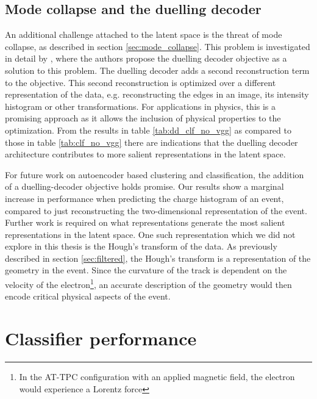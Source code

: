 \subsection{Mode collapse and the duelling decoder}

An additional challenge attached to the latent space is the threat of mode collapse, as described in section \ref{sec:mode_collapse}. This problem is investigated in detail by \citet{Seybold2019}, where the authors propose the duelling decoder objective as a solution to this problem. The duelling decoder adds a second reconstruction term to the objective. This second reconstruction is optimized over a different representation of the data, e.g. reconstructing the edges in an image, its intensity histogram or other transformations. For applications in physics, this is a promising approach as it allows the inclusion of physical properties to the optimization. From the results in table \ref{tab:dd_clf_no_vgg} as compared to those in table \ref{tab:clf_no_vgg} there are indications that the duelling decoder architecture contributes to more salient representations in the latent space. 

For future work on autoencoder based clustering and classification, the addition of a duelling-decoder objective holds promise. Our results show a marginal increase in performance when predicting the charge histogram of an event, compared to just reconstructing the two-dimensional representation of the event. Further work is required on what representations generate the most salient representations in the latent space. One such representation which we did not explore in this thesis is the Hough's transform of the data. As previously described in section \ref{sec:filtered}, the Hough's transform is a representation of the geometry in the event. Since the curvature of the track is dependent on the velocity of the electron\footnote{In the AT-TPC configuration with an applied magnetic field, the electron would experience a Lorentz force}, an accurate description of the geometry would then encode critical physical aspects of the event.


\section{Classifier performance}

